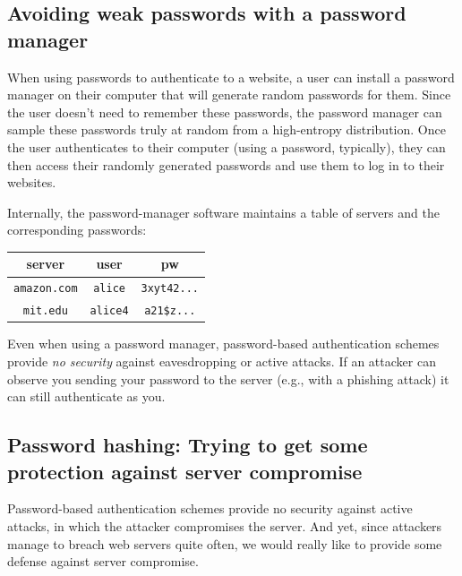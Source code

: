 \documentclass[
  letterpaper,
]{scrbook}
\newcounter{none} %
\theoremstyle{definition}
\theoremstyle{plain}
\theoremstyle{plain}
\theoremstyle{remark}
\begin{document}
\subsection{Avoiding weak passwords with a password
manager}\label{avoiding-weak-passwords-with-a-password-manager}

When using passwords to authenticate to a website, a user can install a
password manager on their computer that will generate random passwords
for them. Since the user doesn't need to remember these passwords, the
password manager can sample these passwords truly at random from a
high-entropy distribution. Once the user authenticates to their computer
(using a password, typically), they can then access their randomly
generated passwords and use them to log in to their websites.

Internally, the password-manager software maintains a table of servers
and the corresponding passwords:

{\def\LTcaptype{none} %
\begin{longtable}[]{@{}ccc@{}}
\toprule\noalign{}
server & user & pw \\
\midrule\noalign{}
\endhead
\bottomrule\noalign{}
\endlastfoot
\texttt{amazon.com} & \texttt{alice} & \texttt{3xyt42...} \\
\texttt{mit.edu} & \texttt{alice4} & \texttt{a21\$z...} \\
\end{longtable}
}

Even when using a password manager, password-based authentication
schemes provide \emph{no security} against eavesdropping or active
attacks. If an attacker can observe you sending your password to the
server (e.g., with a phishing attack) it can still authenticate as you.

\subsection{Password hashing: Trying to get some protection against
server compromise}\label{sec-auth-pwhash}

Password-based authentication schemes provide no security against active
attacks, in which the attacker compromises the server. And yet, since
attackers manage to breach web servers quite often, we would really like
to provide some defense against server compromise.

\end{document}
